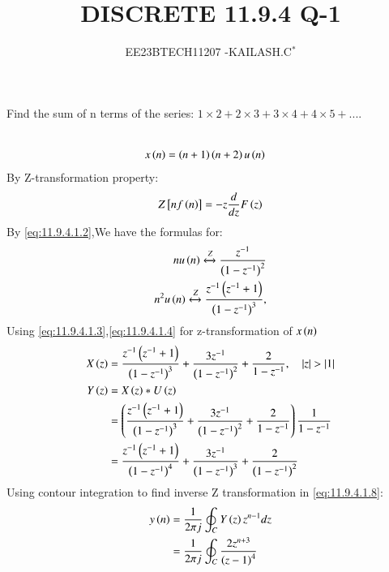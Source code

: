 \documentclass[journal,12pt,twocolumn]{IEEEtran}
\theoremstyle{remark}
\begin{document}

\vspace{3cm}

\title{DISCRETE 11.9.4 Q-1}
\author{EE23BTECH11207 -KAILASH.C$^{*}$%
}
\maketitle
\newpage
\bigskip

\renewcommand{\thefigure}{\theenumi}
\renewcommand{\thetable}{\theenumi}


Find the sum of n terms of the series:
$1\times2+2\times3+3\times4+4\times5+....$\\ \\
\solution
\fi

\begin{align}
 x\left(n\right)&=\left(n+1\right)\left(n+2\right)u\left(n\right)\label{eq:11.9.4.1.1}
\end{align}
By Z-transformation property:
\begin{align}
Z{}\left[nf\left(n\right)\right]=-z\frac{d}{dz}F\left(z\right)\label{eq:11.9.4.1.2}
\end{align}
By \eqref{eq:11.9.4.1.2},We have the formulas for:
\begin{align}
nu\left(n\right)\xleftrightarrow[]{Z} \frac{z^{-1}}{\left(1-z^{-1}\right)^2}\label{eq:11.9.4.1.3}\\
n^2u\left(n\right)\xleftrightarrow[]{Z}\frac{z^{-1}\left(z^{-1}+1\right)}{\left(1-z^{-1}\right)^3},\label{eq:11.9.4.1.4}
\end{align}
Using \eqref{eq:11.9.4.1.3},\eqref{eq:11.9.4.1.4} for z-transformation of $x\left(n\right)$
\begin{align}
    X\left(z\right)&=\frac{z^{-1}\left(z^{-1}+1\right)}{\left(1-z^{-1}\right)^3}+\frac{3z^{-1}}{\left(1-z^{-1}\right)^2}+\frac{2}{1-z^{-1}},\quad\left\vert z\right\vert>\left\vert1\right\vert\label{eq:11.9.4.1.5}\\
    Y\left(z\right)&=X\left(z\right)*U\left(z\right)\label{eq:11.9.4.1.6}\\
   &=\left(\frac{z^{-1}\left(z^{-1}+1\right)}{\left(1-z^{-1}\right)^3}+\frac{3z^{-1}}{\left(1-z^{-1}\right)^2}+\frac{2}{1-z^{-1}}\right)\frac{1}{1-z^{-1}}\label{eq:11.9.4.1.7}\\
    &=\frac{z^{-1}\left(z^{-1}+1\right)}{\left(1-z^{-1}\right)^4}+\frac{3z^{-1}}{\left(1-z^{-1}\right)^3}+\frac{2}{\left(1-z^{-1}\right)^2}\label{eq:11.9.4.1.8}
\end{align}
Using contour integration to find inverse Z transformation in \eqref{eq:11.9.4.1.8}:
\begin{align}
     y\left(n\right) & =  \frac{1}{2\pi j} \oint_C Y\left(z\right) z^{n-1} dz\label{eq:11.9.4.1.9}\\
   &=\frac{1}{2\pi j}\oint_{C}\frac{2z^{n+3}}{\left(z-1\right)^4}\label{eq:11.9.4.1.10}
\end{align}
\end{document}
